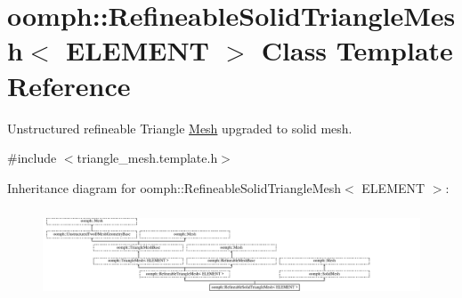 \hypertarget{classoomph_1_1RefineableSolidTriangleMesh}{}\section{oomph\+:\+:Refineable\+Solid\+Triangle\+Mesh$<$ E\+L\+E\+M\+E\+NT $>$ Class Template Reference}
\label{classoomph_1_1RefineableSolidTriangleMesh}


Unstructured refineable Triangle \hyperlink{classoomph_1_1Mesh}{Mesh} upgraded to solid mesh.  




{\ttfamily \#include $<$triangle\+\_\+mesh.\+template.\+h$>$}

Inheritance diagram for oomph\+:\+:Refineable\+Solid\+Triangle\+Mesh$<$ E\+L\+E\+M\+E\+NT $>$\+:\begin{figure}[H]
\begin{center}
\leavevmode
\includegraphics[height=2.709677cm]{classoomph_1_1RefineableSolidTriangleMesh}
\end{center}
\end{figure}
